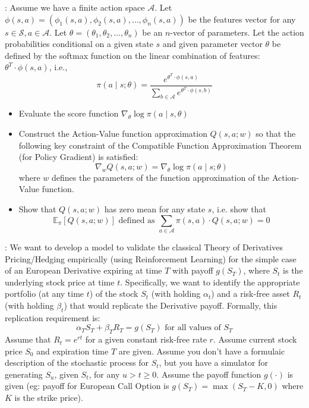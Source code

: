 \documentclass[12pt]{exam}
\begin{document}
\begin{questions}
: Assume we have a finite action space $\mathcal{A}$. Let $\phi(s,a) = (\phi_1(s,a), \phi_2(s,a), \ldots, \phi_n(s,a))$ be the features vector for any $s \in \mathcal{S}, a \in \mathcal{A}$. Let $\theta = (\theta_1, \theta_2, \ldots, \theta_n)$ be an $n$-vector of parameters. Let the action probabilities conditional on a given state $s$ and given parameter vector $\theta$ be defined by the softmax function on the linear combination of features: $\theta^T \cdot \phi(s,a)$, i.e.,
$$\pi(a \mid s;\theta) = \frac {e^{\theta^T \cdot \phi(s,a)}} {\sum_{b \in \mathcal{A}} e^{\theta^T \cdot \phi(s,b)}}$$
\begin{itemize}
\item Evaluate the score function $\nabla_{\theta} \log \pi(a \mid s,\theta)$
\item Construct the Action-Value function approximation $Q(s,a; w)$ so that the following key constraint of the Compatible Function Approximation Theorem (for Policy Gradient) is satisfied:
 $$\nabla_w Q(s,a;w) = \nabla_{\theta} \log \pi(a \mid s;\theta)$$
 where $w$ defines the parameters of the function approximation of the Action-Value function.
 \item Show that $Q(s,a;w)$ has zero mean for any state $s$, i.e. show that
 $$\mathbb{E}_{\pi} [Q(s,a;w)] \mbox{ defined as } \sum_{a \in \mathcal{A}} \pi(s,a) \cdot Q(s,a;w) = 0$$
\end{itemize}
\pagebreak


: We want to develop a model to validate the classical Theory of Derivatives Pricing/Hedging empirically (using Reinforcement Learning) for the simple case of an European Derivative expiring at time $T$ with payoff $g(S_T)$, where $S_t$ is the underlying stock price at time $t$. Specifically, we want to identify the appropriate portfolio (at any time $t$) of the stock $S_t$ (with holding $\alpha_t$) and a risk-free asset $R_t$ (with holding $\beta_t$) that would replicate the Derivative payoff. Formally, this replication requirement is:
$$\alpha_T S_T + \beta_T R_T = g(S_T) \mbox{ for all values of } S_T$$
Assume that $R_t = e^{rt}$ for a given constant risk-free rate $r$. Assume current stock price $S_0$ and expiration time $T$ are given. Assume you don't have a formulaic description of the stochastic process for $S_t$, but you have a simulator for generating $S_u$, given $S_t$, for any $u > t \geq 0$. Assume the payoff function $g(\cdot)$ is given (eg: payoff for European Call Option is $g(S_T) = \max(S_T - K, 0)$ where $K$ is the strike price).


\end{questions}
\end{document}

